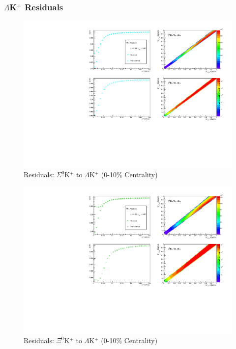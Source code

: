 \documentclass[../AnalysisNoteJBuxton.tex]{subfiles}
\begin{document}
\subsubsection{\texorpdfstring{$\Lambda$K$^{+}$}{TEXT} Residuals}
\label{Residuals_LamKchP}

\begin{figure}[h]
  \centering
  \includegraphics[width=\textwidth]{9_AdditionalFigures/Figures/Residuals/LamKchP/Residuals_LamKchP_0010_Sig0KchP_MomResCrctn_NonFlatBgdCrctn_ResidualsIncluded_UsingCoulombOnlyInterpCfs.pdf}
  \caption[Residuals: $\Sigma^{0}$K$^{+}$ to $\Lambda$K$^{+}$ (0-10\% Centrality)]{Residuals: $\Sigma^{0}$K$^{+}$ to $\Lambda$K$^{+}$ (0-10\% Centrality)}
  \label{fig:Res_LamKchP_0010_Sig0KchP}
\end{figure}


\begin{figure}[h]
  \centering
  \includegraphics[width=\textwidth]{9_AdditionalFigures/Figures/Residuals/LamKchP/Residuals_LamKchP_0010_Xi0KchP_MomResCrctn_NonFlatBgdCrctn_ResidualsIncluded_UsingCoulombOnlyInterpCfs.pdf}
  \caption[Residuals: $\Xi^{0}$K$^{+}$ to $\Lambda$K$^{+}$ (0-10\% Centrality)]{Residuals: $\Xi^{0}$K$^{+}$ to $\Lambda$K$^{+}$ (0-10\% Centrality)}
  \label{fig:Res_LamKchP_0010_Xi0KchP}
\end{figure}
\end{document}
